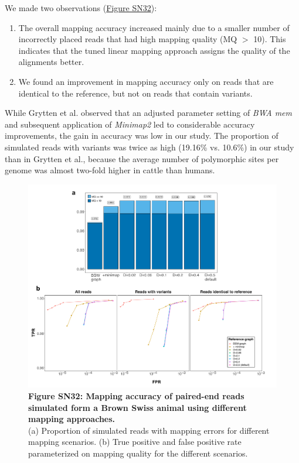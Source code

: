 \documentclass[../main.tex]{subfiles}
\begin{document}
\begin{flushleft}
\bigskip

We made two observations (\hyperlink{Figure SN32}{Figure SN32}):
\begin{enumerate}
    \item The overall mapping accuracy increased mainly due to a smaller number of incorrectly placed reads that had high mapping quality (MQ $>$ 10). This indicates that the tuned linear mapping approach assigns the quality of the alignments better.
    \item We found an improvement in mapping accuracy only on reads that are identical to the reference, but not on reads that contain variants.
\end{enumerate}

\bigskip

While Grytten et al. observed that an adjusted parameter setting of \emph{BWA mem} and subsequent application of \emph{Minimap2} led to considerable accuracy improvements, the gain in accuracy was low in our study. The proportion of simulated reads with variants was twice as high (19.16\% vs. 10.6\%) in our study than in Grytten et al., because the average number of polymorphic sites per genome was almost two-fold higher in cattle than humans.


\begin{figure}[!htb]
    \centering
    \includegraphics[width=\textwidth]{paper2/supplement/roc_tuned_comb.pdf}
    \caption*{\textbf{\hypertarget{Figure SN32}{Figure SN32}: Mapping accuracy of paired-end reads simulated form a Brown Swiss
    animal using different mapping approaches.} \\
    \small{(a) Proportion of simulated reads with mapping errors for different mapping scenarios. (b) True positive and false positive rate parameterized on mapping quality for the different scenarios.}}
\end{figure}


\end{flushleft}
\end{document}
